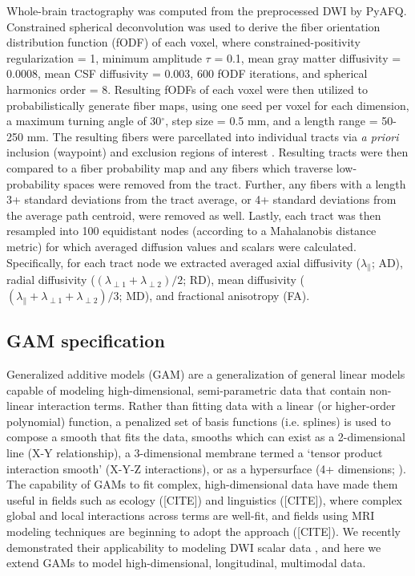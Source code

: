 \documentclass[12pt]{article}
\begin{document}
Whole-brain tractography was computed from the preprocessed DWI by PyAFQ. Constrained spherical deconvolution was used to derive the fiber orientation distribution function (fODF) of each voxel, where constrained-positivity regularization = 1, minimum amplitude $\tau$ = 0.1, mean gray matter diffusivity = 0.0008, mean CSF diffusivity = 0.003, 600 fODF iterations, and spherical harmonics order = 8. Resulting fODFs of each voxel were then utilized to probabilistically generate fiber maps, using one seed per voxel for each dimension, a maximum turning angle of 30$^\circ$, step size = 0.5 mm, and a length range = 50-250 mm. The resulting fibers were parcellated into individual tracts via \textit{a priori} inclusion (waypoint) and exclusion regions of interest \parencite{wakana2007ReproducibilityQuantitativeTractography}. Resulting tracts were then compared to a fiber probability map \parencite{hua2008TractProbabilityMaps} and any fibers which traverse low-probability spaces were removed from the tract. Further, any fibers with a length 3+ standard deviations from the tract average, or 4+ standard deviations from the average path centroid, were removed as well. Lastly, each tract was then resampled into 100 equidistant nodes (according to a Mahalanobis distance metric) for which averaged diffusion values and scalars were calculated. Specifically, for each tract node we extracted averaged axial diffusivity ($\lambda_\parallel$; AD), radial diffusivity ($(\lambda_{\perp1}+\lambda_{\perp2})/2$; RD), mean diffusivity ($(\lambda_\parallel+\lambda_{\perp1}+\lambda_{\perp2})/3$; MD), and fractional anisotropy (FA).



\subsection{GAM specification}
\label{ssec:meth-gam}
Generalized additive models (GAM) are a generalization of general linear models capable of modeling high-dimensional, semi-parametric data that contain non-linear interaction terms. Rather than fitting data with a linear (or higher-order polynomial) function, a penalized set of basis functions (i.e. splines) is used to compose a smooth that fits the data, smooths which can exist as a 2-dimensional line (X-Y relationship), a 3-dimensional membrane termed a `tensor product interaction smooth' (X-Y-Z interactions), or as a hypersurface (4+ dimensions; \cite{baayen2020IntroductionGeneralizedAdditive}). The capability of GAMs to fit complex, high-dimensional data have made them useful in fields such as ecology ([CITE]) and linguistics ([CITE]), where complex global and local interactions across terms are well-fit, and fields using MRI modeling techniques are beginning to adopt the approach ([CITE]). We recently demonstrated their applicability to modeling DWI scalar data \parencite{muncy2022GeneralAdditiveModels}, and here we extend GAMs to model high-dimensional, longitudinal, multimodal data.
\end{document}
